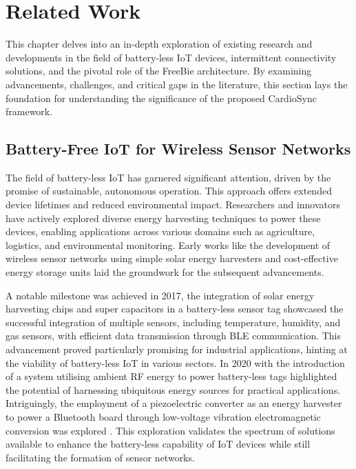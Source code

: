 
\chapter{Related Work}
\label{chap:literature}
This chapter delves into an in-depth exploration of existing research and developments in the field of battery-less IoT devices, intermittent connectivity solutions, and the pivotal role of the FreeBie architecture. By examining advancements, challenges, and critical gaps in the literature, this section lays the foundation for understanding the significance of the proposed CardioSync framework.


\section{Battery-Free IoT for Wireless Sensor Networks}
The field of battery-less IoT has garnered significant attention, driven by the promise of sustainable, autonomous operation. This approach offers extended device lifetimes and reduced environmental impact. Researchers and innovators have actively explored diverse energy harvesting techniques to power these devices, enabling applications across various domains such as agriculture, logistics, and environmental monitoring. Early works like the development of wireless sensor networks using simple solar energy harvesters and cost-effective energy storage units \cite{4394148} laid the groundwork for the subsequent advancements.
\vspace{1\baselineskip}

\noindent A notable milestone was achieved in 2017, the integration of solar energy harvesting chips and super capacitors in a battery-less sensor tag \cite{7990978} showcased the successful integration of multiple sensors, including temperature, humidity, and gas sensors, with efficient data transmission through BLE communication. This advancement proved particularly promising for industrial applications, hinting at the viability of battery-less IoT in various sectors. In 2020 with the introduction of a system utilising ambient RF energy to power battery-less tags \cite{10.1145/3386901.3396604} highlighted the potential of harnessing ubiquitous energy sources for practical applications. Intriguingly, the employment of a piezoelectric converter as an energy harvester to power a Bluetooth board through low-voltage vibration electromagnetic conversion was explored \cite{9221051}. This exploration validates the spectrum of solutions available to enhance the battery-less capability of IoT devices while still facilitating the formation of sensor networks. 
\vspace{1\baselineskip}

